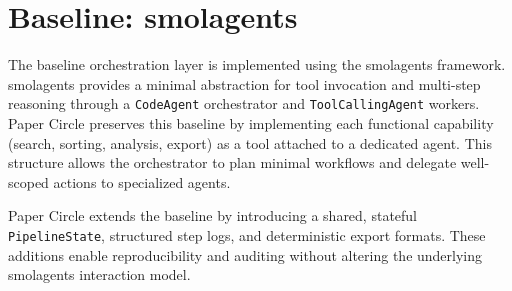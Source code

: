 \section{Baseline: smolagents}
The baseline orchestration layer is implemented using the smolagents framework. smolagents provides a minimal abstraction for tool invocation and multi-step reasoning through a \texttt{CodeAgent} orchestrator and \texttt{ToolCallingAgent} workers. Paper Circle preserves this baseline by implementing each functional capability (search, sorting, analysis, export) as a tool attached to a dedicated agent. This structure allows the orchestrator to plan minimal workflows and delegate well-scoped actions to specialized agents.

Paper Circle extends the baseline by introducing a shared, stateful \texttt{PipelineState}, structured step logs, and deterministic export formats. These additions enable reproducibility and auditing without altering the underlying smolagents interaction model.
